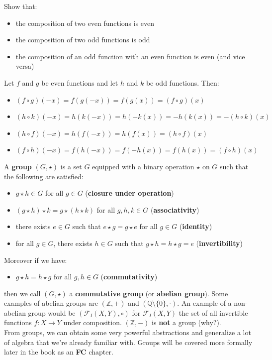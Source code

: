 \documentclass[12pt, a4paper, titlepage, twoside]{article}
\newcommand*{\Z}{\mathbb{Z}}
\newcommand*{\Q}{\mathbb{Q}}
\newcounter{excount}[subsection]
\begin{document}
	\begin{ex}
		Show that: 
		\begin{itemize}
			\item the composition of two even functions is even
			\item the composition of two odd functions is odd
			\item the composition of an odd function with an even function is even (and vice versa)
		\end{itemize}
		
		\tcbline
		\hfill
		
		Let $f$ and $g$ be even functions and let $h$ and $k$ be odd functions. Then:
		\begin{itemize}
			\item $(f \circ g)(-x) = f(g(-x)) = f(g(x)) = (f \circ g)(x)$
			\item $(h \circ k)(-x) = h(k(-x)) = h(-k(x)) = -h(k(x)) = -(h \circ k)(x)$
			\item $(h \circ f)(-x) = h(f(-x)) = h(f(x)) = (h \circ f)(x)$
			\item $(f \circ h)(-x) = f(h(-x)) = f(-h(x)) = f(h(x)) = (f \circ h)(x)$
		\end{itemize}
	\end{ex}
	
	\hfill
	
	\begin{fr}[Groups]
		A \textbf{group} $(G, \star)$ is a set $G$ equipped with a binary operation $\star$ on $G$ such that the following are satisfied:
		\begin{itemize}
			\item $g \star h \in G$ for all $g \in G$ (\textbf{closure under operation})
			\item $(g \star h) \star k = g \star (h \star k)$ for all $g,h,k \in G$ (\textbf{associativity})
			\item there exists $e \in G$ such that $e \star g = g \star e$ for all $g \in G$ (\textbf{identity})
			\item for all $g \in G$, there exists $h \in G$ such that $g \star h = h \star g = e$ (\textbf{invertibility})
		\end{itemize}
		
		Moreover if we have:
		\begin{itemize}
			\item $g \star h = h \star g$ for all $g,h \in G$ (\textbf{commutativity})
		\end{itemize}
		
		then we call $(G, \star)$ a \textbf{commutative group} (or \textbf{abelian group}). Some examples of abelian groups are $(\Z, +)$ and
		$(\Q \setminus \{0\}, \cdot)$. An example of a non-abelian group would be $(\mathcal{F}_I(X, Y), \circ)$ for $\mathcal{F}_I(X, Y)$ 
		the set of all invertible functions $f : X \to Y$ under composition. $(\Z, -)$ is \textbf{not} a group (why?).\\
		
		From groups, we can obtain some very powerful abstractions and generalize a lot of algebra that we're already familiar with.
		Groups will be covered more formally later in the book as an \textbf{FC} chapter.
	\end{fr}
	
\end{document}
